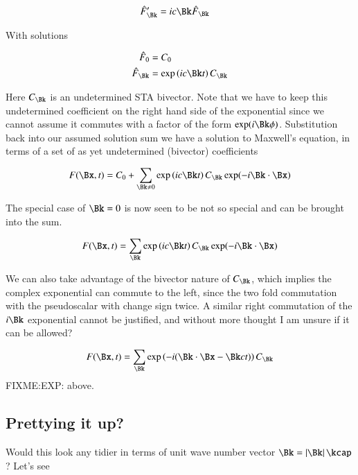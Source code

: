 \documentclass{article}
\begin{document}
\begin{align*}
\hat{F}_{\Bk}' &= i c \Bk \hat{F}_{\Bk}
\end{align*}

With solutions

\begin{align*}
\hat{F}_{0} &= C_{0} \\
\hat{F}_{\Bk} &= \exp\left(i c \Bk t \right) C_{\Bk} \\
\end{align*}

Here $C_{\Bk}$ is an undetermined STA bivector.  Note that we have to keep this undetermined coefficient on the right hand side of the exponential since we cannot assume it commutes with a factor of the form $\exp(i\Bk\phi)$.  Substitution back into our assumed solution sum we have a solution to Maxwell's equation, in terms of a set of as yet undetermined (bivector) coefficients

\begin{align*}
F(\Bx,t) = C_0 + \sum_{\Bk \ne 0} \exp\left(i c \Bk t \right) C_{\Bk} \exp(-i \Bk \cdot \Bx )
\end{align*}

The special case of $\Bk = 0$ is now seen to be not so special and can be brought into the sum.  

\begin{align*}
F(\Bx,t) = \sum_{\Bk} \exp\left(i c \Bk t \right) C_{\Bk} \exp(-i \Bk \cdot \Bx )
\end{align*}

We can also 
take advantage of the bivector nature of $C_{\Bk}$, which implies the complex exponential can commute to the left, since the two fold commutation with the pseudoscalar with change sign twice.  A similar right commutation of the $i\Bk$ exponential cannot be justified, and without more thought I am unsure if it can be allowed?

\begin{align}\label{eqn:undetermined}
F(\Bx,t) = \sum_{\Bk} \exp\left(-i (\Bk \cdot \Bx - \Bk c t) \right) C_{\Bk} 
\end{align}
FIXME:EXP: above.

\subsection{ Prettying it up? }

Would this look any tidier in terms of unit wave number vector $\Bk = \Abs{\Bk} \kcap$?  Let's see
\end{document}
